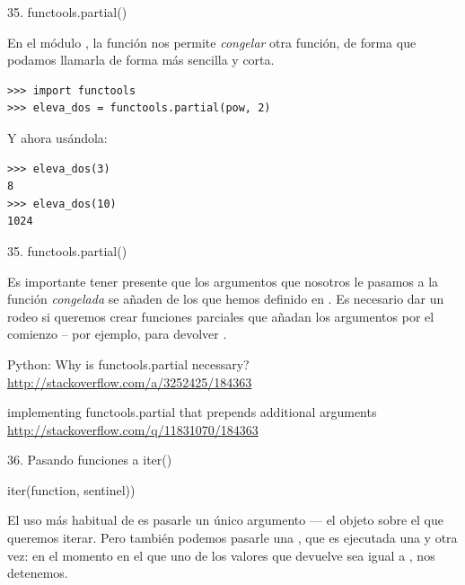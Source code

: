 \documentclass[14pt]{beamer}
\begin{document}
\begin{frame}[fragile]{35. functools.partial()}
  \small
  \begin{block}{}
    \centering
    En el módulo , la función
     nos permite \emph{congelar} otra función,
     de forma que podamos llamarla de
    forma más sencilla y corta.
  \end{block}

  \begin{exampleblock}{}
    \begin{lstlisting}
>>> import functools
>>> eleva_dos = functools.partial(pow, 2)
    \end{lstlisting}
  \end{exampleblock}

\begin{exampleblock}
  {Y ahora usándola:}
    \begin{lstlisting}
>>> eleva_dos(3)
8
>>> eleva_dos(10)
1024
    \end{lstlisting}
  \end{exampleblock}
\end{frame}

\begin{frame}[fragile]{35. functools.partial()}
  \small
  \begin{alertblock}{}
    \centering
    Es importante tener presente que los argumentos que nosotros le
    pasamos a la función \emph{congelada} se añaden
     de los que hemos definido en
    . Es necesario dar un rodeo si queremos crear
    funciones parciales que añadan los argumentos por el comienzo --
    por ejemplo, para devolver .
  \end{alertblock}

  \begin{block}
    {\centering Python: Why is functools.partial necessary?}
    \centering \url{http://stackoverflow.com/a/3252425/184363}
  \end{block}

  \begin{block}
    {\centering implementing functools.partial that prepends additional arguments}
    \centering \url{http://stackoverflow.com/q/11831070/184363}
  \end{block}
\end{frame}

\begin{frame}[fragile]{36. Pasando funciones a iter()}
  \begin{block}{}
    \Large
    \centering iter(function, sentinel))
  \end{block}

  \small
  \begin{alertblock}{}
    \centering
    El uso más habitual de  es pasarle un único
    argumento --- el objeto sobre el que queremos iterar. Pero también
    podemos pasarle una , que es ejecutada una y
    otra vez: en el momento en el que uno de los valores que devuelve
    sea igual a , nos detenemos.
  \end{alertblock}
\end{frame}
\end{document}
